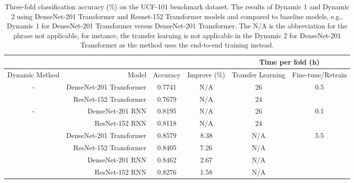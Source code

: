 \documentclass[fleqn,10pt]{wlscirep}
\begin{document}
\begin{table}[!htb]
\centering
\caption{Three-fold classification accuracy (\%) on the UCF-101 benchmark dataset. The results of Dynamic 1 and Dynamic 2 using DenseNet-201 Transformer and Resnet-152 Transformer models and compared to baseline models, e.g., Dynamic 1 for DenseNet-201 Transformer versus DenseNet-201 Transformer. The N/A is the abbreviation for the phrase not applicable, for instance, the transfer learning is not applicable in the Dynamic 2 for DenseNet-201 Transformer as the method uses the end-to-end training instead.}
\label{tab:table_dynamics_transformer}
\begin{tabular}{|c|r|c|c|c|c|} 
\hline
\multicolumn{4}{|l|}{}                                                                            & \multicolumn{2}{c|}{Time per fold (h)}             \\ 
\hline
\multicolumn{1}{|l|}{Dynamic Method} & Model                    & Accuracy        & Improve (\%)  & Transfer Learning & Fine-tune/Retrain     \\ 
\hline
\multirow{2}{*}{-}                   & DenseNet-201 Transformer & 0.7741          & N/A             & 26                & \multirow{2}{*}{0.5}  \\ 
\cline{2-5}
                                     & ResNet-152 Transformer   & 0.7679          & N/A             & 24                &                       \\ 
\hline
\multirow{2}{*}{-}                   & DenseNet-201 RNN         & 0.8195          & N/A             & 26                & \multirow{2}{*}{0.1}  \\ 
\cline{2-5}
                                     & ResNet-152 RNN           & 0.8118          & N/A             & 24                &                       \\ 
\hhline{|======|}
\multirow{4}{*}{Dynamic 1}           & DenseNet-201 Transformer & 0.8579          & 8.38          & N/A                 & \multirow{6}{*}{5.5}  \\ 
\cline{2-5}
                                     & ResNet-152 Transformer   & 0.8405          & 7.26          & N/A                 &                       \\ 
\cline{2-5}
                                     & DenseNet-201 RNN         & 0.8462          & 2.67          & N/A                 &                       \\ 
\cline{2-5}
                                     & ResNet-152 RNN           & 0.8276          & 1.58          & N/A                 &                       \\ 

\end{tabular}
\end{table}
\end{document}
